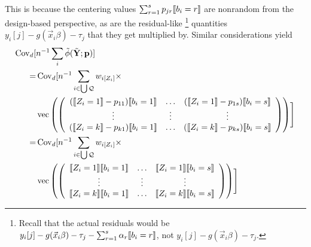 \documentclass{article}
\DeclarePairedDelimiter{\indicator}{\llbracket}{\rrbracket}
\newcommand{\owt}[1][z_i]{\ensuremath{w_{i[#1]}}}
\begin{document}
This is because the centering values
$\sum_{r=1}^{s}p_{jr}\indicator{b_{i}=r}$ are nonrandom from the
design-based perspective, as are the residual-like%
\footnote{Recall that the actual residuals would be $y_{i}[j] -
  g(\vec{x}_{i}\beta) - \tau_{j} - \sum_{r=1}^{s}\alpha_{r}\indicator{b_{i}=r}$, not $y_{i}[j] - g(\vec{x}_{i}\beta) - \tau_{j}$.}
quantities
$y_{i}[j] - g(\vec{x}_{i}\beta) - \tau_{j}$ that they get
multiplied by.  Similar considerations yield
\begin{align}
\operatorname{Cov}_{d}[
  &n^{-1}\sum_{i}\tilde{\phi}(\tilde{\mathbf{Y}}; \mathbf{p})] \nonumber\\
  =&\operatorname{Cov}_{d}[n^{-1}
                                                 \sum_{i \in \bigcup
     \mathcal{Q}} \owt[Z_{i}] \times \nonumber \\
&  \operatorname{vec}\left(%
                                                 \left(
                                                 \begin{array}{ccc}
                                                   (\indicator{Z_{i}=1}-p_{11})\indicator{b_{i}=1}&\ldots&(\indicator{Z_{i}=1}-p_{1s})\indicator{b_{i}=s}\\
                                                   \vdots & \vdots &
                                                                     \vdots
                                                   \\
                                                   (\indicator{Z_{i}=k}-p_{k1})\indicator{b_{i}=1}&\ldots&(\indicator{Z_{i}=k}-p_{ks})\indicator{b_{i}=s}\\                                                   
                                                 \end{array}
  \right)%
  \right)
  \Biggr] \nonumber \\ 
  =&\operatorname{Cov}_{d}[n^{-1}
                                                 \sum_{i \in \bigcup
     \mathcal{Q}} \owt[Z_{i}] \times \nonumber \\
  &\operatorname{vec}\left(%
                                                 \left(
                                                 \begin{array}{ccc}
                                                   \indicator{Z_{i}=1}\indicator{b_{i}=1}&\ldots&\indicator{Z_{i}=1}\indicator{b_{i}=s}\\
                                                   \vdots & \vdots &
                                                                     \vdots
                                                   \\
                                                   \indicator{Z_{i}=k}\indicator{b_{i}=1}&\ldots&\indicator{Z_{i}=k}\indicator{b_{i}=s}\\                                                   
                                                 \end{array}  
  \right)%
  \right)
    \Biggr] \label{eq:11}
\end{align}
\end{document}

